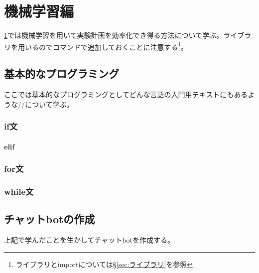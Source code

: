 \documentclass[dvipdfmx, leqno]{jsreport}
\begin{document}





\chapter{機械学習編}\label{chap:機械学習編}%
    \cref{chap:機械学習編}では機械学習を用いて実験計画を効率化でき得る方法について学ぶ。ライブラリを用いるのでコマンドで追加しておくことに注意する\footnote{ライブラリとimportについては\S\ref{sec:ライブラリ}を参照}。

\section{基本的なプログラミング}
    ここでは基本的なプログラミングとしてどんな言語の入門用テキストにもあるような//について学ぶ。

\subsection{if文}


\subsubsection{elif}


\subsection{for文}

\subsection{while文}



\section{チャットbotの作成}
    上記で学んだことを生かしてチャットbotを作成する。
\end{document}
